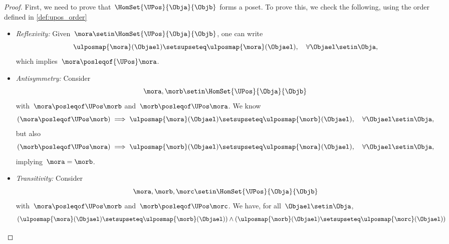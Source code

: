 \begin{proof}
    First, we need to prove that~$\HomSet{\UPos}{\Obja}{\Objb}$ forms a poset.
    To prove this, we check the following, using the order defined in \cref{def:upos_order}
    \begin{itemize}
        \item \emph{Reflexivity:} Given~$\mora \setin \HomSet{\UPos}{\Obja}{\Objb}$, one can write
              \begin{equation}
                  \ulposmap{\mora}(\Objael) \setsupseteq \ulposmap{\mora}(\Objael), \quad \forall \Objael \setin \Obja,
              \end{equation}
              which implies~$\mora \posleqof{\UPos} \mora$.
        \item \emph{Antisymmetry:}
              Consider
              \begin{equation}
                  \mora,\morb \setin \HomSet{\UPos}{\Obja}{\Objb}
              \end{equation} with~$\mora \posleqof\UPos \morb$ and~$\morb \posleqof\UPos \mora$.
              We know
              \begin{equation}
                  (\mora \posleqof\UPos \morb)
                  \implies \ulposmap{\mora}(\Objael) \setsupseteq \ulposmap{\morb}(\Objael), \quad \forall \Objael \setin \Obja,
              \end{equation}
              but also
              \begin{equation}
                  (\morb \posleqof\UPos \mora)
                  \implies \ulposmap{\morb}(\Objael) \setsupseteq \ulposmap{\mora}(\Objael), \quad \forall \Objael \setin \Obja,
              \end{equation}
              implying~$\mora=\morb$.
        \item \emph{Transitivity:}
              Consider
              \begin{equation}
                  \mora,\morb,\morc \setin \HomSet{\UPos}{\Obja}{\Objb}
              \end{equation}
              with~$\mora \posleqof\UPos \morb$ and~$\morb \posleqof\UPos \morc$.
              We have, for all~$\Objael\setin \Obja$,
              \begin{equation}
                  \begin{aligned}
                      (\ulposmap{\mora}(\Objael) \setsupseteq \ulposmap{\morb}(\Objael))
                      \wedge ( \ulposmap{\morb}(\Objael) \setsupseteq \ulposmap{\morc}(\Objael))

\end{aligned}
\end{equation}
\end{itemize}
\end{proof}
